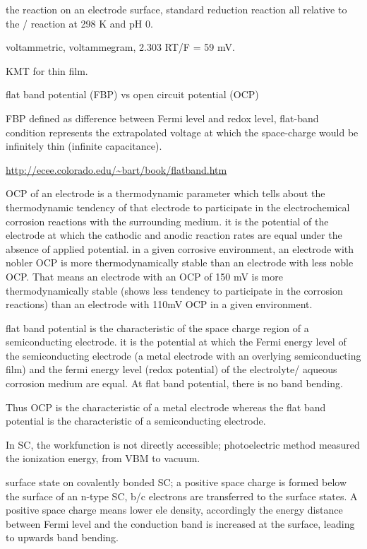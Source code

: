 the reaction on an electrode surface, standard reduction reaction all relative to the / reaction at 298 K and pH 0. 

voltammetric, voltammegram, 2.303 RT/F = 59 mV. 

KMT for thin film. \cite{Murphy2007}

flat band potential (FBP) vs open circuit potential (OCP)

FBP defined as difference between Fermi level and redox level, 
flat-band condition represents the extrapolated voltage at which the space-charge would be infinitely thin (infinite capacitance).

\url{http://ecee.colorado.edu/~bart/book/flatband.htm}

OCP of an electrode is a thermodynamic parameter which tells about the thermodynamic tendency of that electrode to participate in the electrochemical corrosion reactions with the surrounding medium. it is the potential of the electrode at which the cathodic and anodic reaction rates are equal under the absence of applied potential. in a given corrosive environment, an electrode with nobler OCP is more thermodynamically stable than an electrode with less noble OCP. That means an electrode with an OCP of 150 mV is more thermodynamically stable (shows less tendency to participate in the corrosion reactions) than an electrode with 110mV OCP in a given environment.

flat band potential is the characteristic of the space charge region of a semiconducting electrode. it is the potential at which the Fermi energy level of the semiconducting electrode (a metal electrode with an overlying semiconducting film) and the fermi energy level (redox potential) of the electrolyte/ aqueous corrosion medium are equal. At flat band potential, there is no band bending.

Thus OCP is the characteristic of a metal electrode whereas the flat band potential is the characteristic of a semiconducting electrode.

In SC, the workfunction is not directly accessible; photoelectric method measured the ionization energy, from VBM to vacuum. 

surface state on covalently bonded SC; a positive space charge is formed below the surface of an n-type SC, b/c electrons are transferred to the surface states. A positive space charge means lower ele density, accordingly the energy distance between Fermi level and the conduction band is increased at the surface, leading to upwards band bending. 


